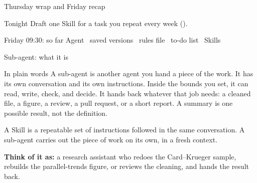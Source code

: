\begin{frame}{Thursday wrap and Friday recap}
  \vspace{0.3em}
  \begin{block}{Tonight}
    Draft one Skill for a task you repeat every week ().
  \end{block}
  \vspace{0.4em}
  \begin{block}{Friday 09:30: so far}
    Agent \textperiodcentered\ saved versions \textperiodcentered\
    rules file \textperiodcentered\ to-do list \textperiodcentered\
    Skills
  \end{block}
\end{frame}

\begin{frame}{Sub-agent: what it is}
  \timebox{Fri 09:35--09:55}
  \begin{block}{In plain words}
    A sub-agent is another agent you hand a piece of the work. It has its own
    conversation and its own instructions. Inside the bounds you set, it can read,
    write, check, and decide. It hands back whatever that job needs: a cleaned file,
    a figure, a review, a pull request, or a short report. A summary is one possible
    result, not the definition.

    A Skill is a repeatable set of instructions followed in the same conversation.
    A sub-agent carries out the piece of work on its own, in a fresh context.
  \end{block}
  \vspace{0.4em}
  {\textcolor{courseteal}{\textbf{Think of it as:}} a research assistant who redoes
    the Card--Krueger sample, rebuilds the parallel-trends figure, or reviews the
    cleaning, and hands the result back.}
\end{frame}

